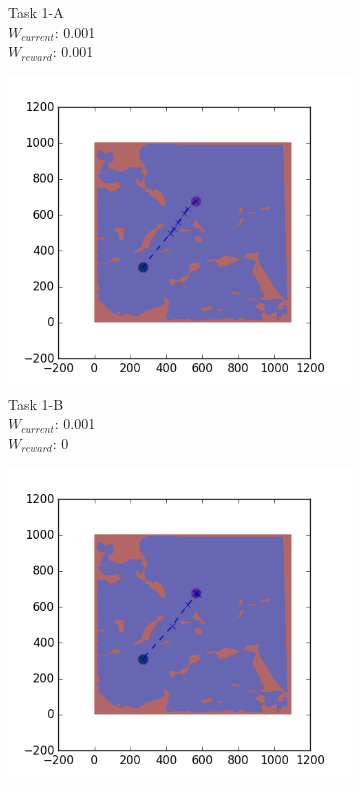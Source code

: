 \documentclass{tamuccthesis}
\begin{document}
\begin{figure}
\begin{subfigure}[b]{0.24\textwidth}
        \caption[interval 3]%
        {{\small Task 1-A \\ $W_{current}$: 0.001 \\ $W_{reward}$: 0.001}}
        \label{fig:Path_1-A_upCurrent_Reward}
    \end{subfigure}
    \begin{subfigure}[b]{0.24\textwidth}
        \centering
        \includegraphics[width=\textwidth,trim={4cm 3cm 2cm 3cm},clip]{EXP3RG_PathAb_-1_-1_0d001_0.png}
        \caption[interval 1]%
        {{\small Task 1-B \\ $W_{current}$: 0.001 \\ $W_{reward}$: 0}}
        \label{fig:Path_1-B_upCurrent_noReward}
    \end{subfigure}
    \begin{subfigure}[b]{0.24\textwidth}  
        \centering 
        \includegraphics[width=\textwidth,trim={4cm 3cm 2cm 3cm},clip]{EXP3RG_PathAb_-1_-1_0d001_-1.png}

\end{subfigure}
\end{figure}
\end{document}
